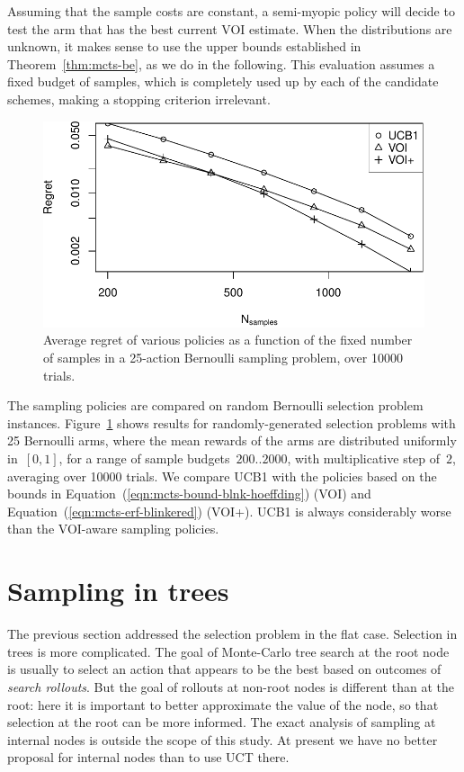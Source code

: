 Assuming that the sample costs are constant,
a semi-myopic policy will decide to test the arm that has the best
current VOI estimate. 
When the distributions are unknown, it makes sense
to use the upper bounds established in Theorem~\ref{thm:mcts-be}, as we do in the following.
This evaluation assumes a fixed budget of samples, which is
completely used up by each of the candidate schemes, making a stopping
criterion irrelevant.

\begin{figure}[h!]
\centering
\includegraphics[scale=0.55]{mcts-flat.pdf}
\caption{Average regret of various policies as a function of the fixed number 
of samples in a 25-action Bernoulli sampling problem, over 10000 trials.}
\label{fig:random-instances}
\end{figure}

The sampling policies are compared on random Bernoulli
selection problem instances. Figure~\ref{fig:random-instances} shows results for
randomly-generated selection problems with 25 Bernoulli arms, where
the mean rewards of the arms are distributed uniformly in~$[0,1]$, 
for a range of sample budgets~$200..2000$, with multiplicative
step of~$2$, averaging over 10000 trials.  We compare UCB1 with the 
policies based on the bounds in
Equation~(\ref{eqn:mcts-bound-blnk-hoeffding}) (VOI) and
Equation~(\ref{eqn:mcts-erf-blinkered}) (VOI+).
UCB1 is always considerably worse than the VOI-aware sampling policies.


\section{Sampling in trees}
\label{sec:mcts-sampling-in-trees}

The previous section addressed the selection problem in the flat case.
Selection in trees is more complicated.  The goal of Monte-Carlo tree 
search \cite{Chaslot.montecarlo} at the root node 
is usually to select an action that appears to be the best based on outcomes
of \textit{search rollouts}.
But the goal of rollouts at non-root nodes
is different than at the root: here it is important to better approximate the
value of the node, so that selection at the root can be more informed. The exact analysis
of sampling at internal nodes is outside the scope of this study. At present we 
have no better proposal for internal nodes than to use UCT there.

